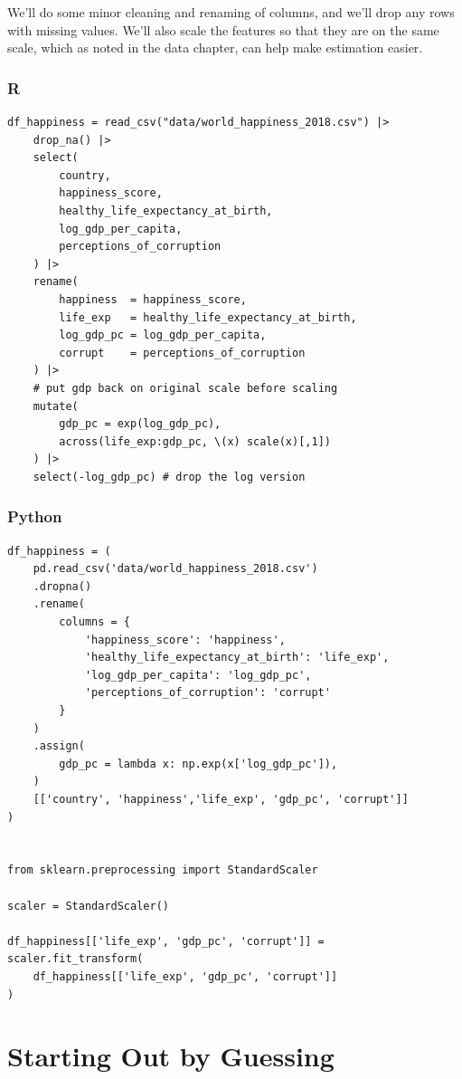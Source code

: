 \documentclass[
  letterpaper,
]{krantz}
\begin{document}
\normalsize

We'll do some minor cleaning and renaming of columns, and we'll drop any
rows with missing values. We'll also scale the features so that they are
on the same scale, which as noted in the data chapter, can help make
estimation easier.

\subsubsection{R}

\begin{verbatim}
df_happiness = read_csv("data/world_happiness_2018.csv") |>
    drop_na() |>
    select(
        country,
        happiness_score,
        healthy_life_expectancy_at_birth,
        log_gdp_per_capita,
        perceptions_of_corruption
    ) |>
    rename(
        happiness  = happiness_score,
        life_exp   = healthy_life_expectancy_at_birth,
        log_gdp_pc = log_gdp_per_capita,
        corrupt    = perceptions_of_corruption
    ) |>
    # put gdp back on original scale before scaling
    mutate(
        gdp_pc = exp(log_gdp_pc), 
        across(life_exp:gdp_pc, \(x) scale(x)[,1])
    ) |>
    select(-log_gdp_pc) # drop the log version
\end{verbatim}

\subsubsection{Python}

\begin{verbatim}
df_happiness = (
    pd.read_csv('data/world_happiness_2018.csv')
    .dropna()
    .rename(
        columns = {
            'happiness_score': 'happiness',
            'healthy_life_expectancy_at_birth': 'life_exp',
            'log_gdp_per_capita': 'log_gdp_pc',
            'perceptions_of_corruption': 'corrupt'
        }
    )
    .assign(
        gdp_pc = lambda x: np.exp(x['log_gdp_pc']),
    )    
    [['country', 'happiness','life_exp', 'gdp_pc', 'corrupt']]
)


from sklearn.preprocessing import StandardScaler

scaler = StandardScaler()

df_happiness[['life_exp', 'gdp_pc', 'corrupt']] = scaler.fit_transform(
    df_happiness[['life_exp', 'gdp_pc', 'corrupt']]
)
\end{verbatim}

\section{Starting Out by Guessing}\label{sec-estim-guessing}
\end{document}
